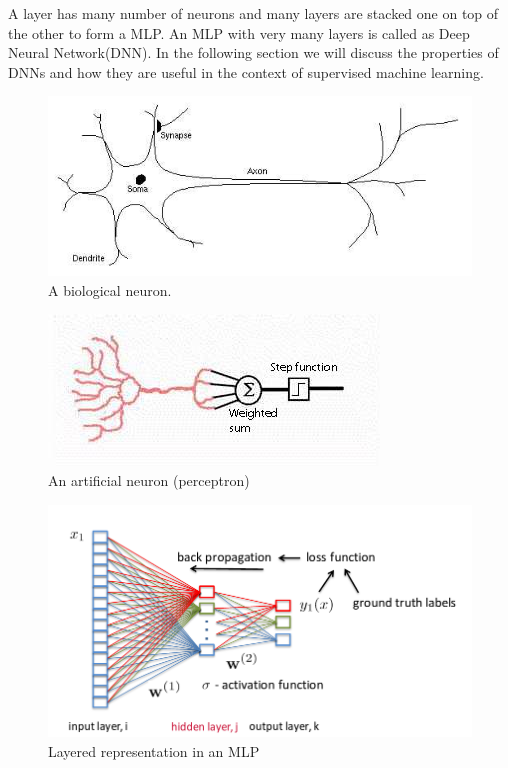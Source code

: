 \documentclass[conference]{IEEEtran}
\begin{document}
A layer has many number of neurons and many layers are stacked one on top of the other to form a MLP. An MLP with very many layers is called as Deep Neural Network(DNN). In the following section we will discuss the properties of DNNs and how they are useful in the context of supervised machine learning.


\begin{figure}
    \includegraphics[width=.99\linewidth]{img/bioneuron.jpg}  
    \caption{A biological neuron.}
    \label{fig:neuron}
\end{figure}

\begin{figure}
    \includegraphics[width=.99\linewidth]{img/artificial.jpg}  
    \caption{ An artificial neuron (perceptron)}
    \label{fig:ann}
\end{figure}


\begin{figure}
    \includegraphics[width=.99\linewidth]{img/mlp.png}  
    \caption{Layered representation in an MLP}
    \label{fig:mlp}
\end{figure}
\end{document}
